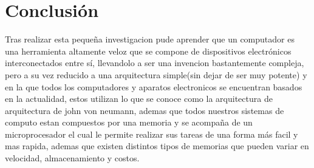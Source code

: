 \documentclass{article}
\begin{document}
\section{Conclusión} \label{conclulsion}
\noindent
Tras realizar esta pequeña investigacion pude aprender que un computador es una herramienta altamente veloz que se compone de dispositivos electrónicos interconectados entre sí, llevandolo a ser una invencion bastantemente compleja, pero a su vez reducido a una arquitectura simple(sin dejar de ser muy potente) y en la que todos los computadores y aparatos electronicos se encuentran basados en la actualidad, estos utilizan  lo que se conoce como la arquitectura de arquitectura de john von neumann, ademas que todos nuestros sistemas de computo estan compuestos por una memoria y se acompaña de un microprocesador el cual le permite realizar sus tareas de una forma más facil y mas rapida, ademas que existen distintos tipos de memorias que pueden variar en velocidad, almacenamiento y costos.



\end{document}
